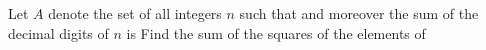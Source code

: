 Let $A$ denote the set of all integers $n$ such that  and moreover the sum of the decimal digits of $n$ is  Find the sum of the squares of the elements of 